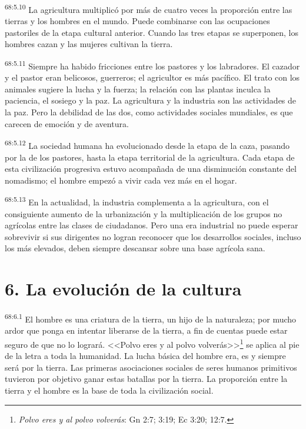 \documentclass[twoside, 11pt]{book}
\begin{document}
\par
\textsuperscript{68:5.10} La agricultura multiplicó por más de cuatro veces la proporción entre las tierras y los hombres en el mundo. Puede combinarse con las ocupaciones pastoriles de la etapa cultural anterior. Cuando las tres etapas se superponen, los hombres cazan y las mujeres cultivan la tierra.

\par
\textsuperscript{68:5.11} Siempre ha habido fricciones entre los pastores y los labradores. El cazador y el pastor eran belicosos, guerreros; el agricultor es más pacífico. El trato con los animales sugiere la lucha y la fuerza; la relación con las plantas inculca la paciencia, el sosiego y la paz. La agricultura y la industria son las actividades de la paz. Pero la debilidad de las dos, como actividades sociales mundiales, es que carecen de emoción y de aventura.

\par
\textsuperscript{68:5.12} La sociedad humana ha evolucionado desde la etapa de la caza, pasando por la de los pastores, hasta la etapa territorial de la agricultura. Cada etapa de esta civilización progresiva estuvo acompañada de una disminución constante del nomadismo; el hombre empezó a vivir cada vez más en el hogar.

\par
\textsuperscript{68:5.13} En la actualidad, la industria complementa a la agricultura, con el consiguiente aumento de la urbanización y la multiplicación de los grupos no agrícolas entre las clases de ciudadanos. Pero una era industrial no puede esperar sobrevivir si sus dirigentes no logran reconocer que los desarrollos sociales, incluso los más elevados, deben siempre descansar sobre una base agrícola sana.

\section*{6. La evolución de la cultura}
\par
\textsuperscript{68:6.1} El hombre es una criatura de la tierra, un hijo de la naturaleza; por mucho ardor que ponga en intentar liberarse de la tierra, a fin de cuentas puede estar seguro de que no lo logrará. <<Polvo eres y al polvo volverás>>\footnote{\textit{Polvo eres y al polvo volverás}: Gn 2:7; 3:19; Ec 3:20; 12:7.} se aplica al pie de la letra a toda la humanidad. La lucha básica del hombre era, es y siempre será por la tierra. Las primeras asociaciones sociales de seres humanos primitivos tuvieron por objetivo ganar estas batallas por la tierra. La proporción entre la tierra y el hombre es la base de toda la civilización social.
\end{document}
